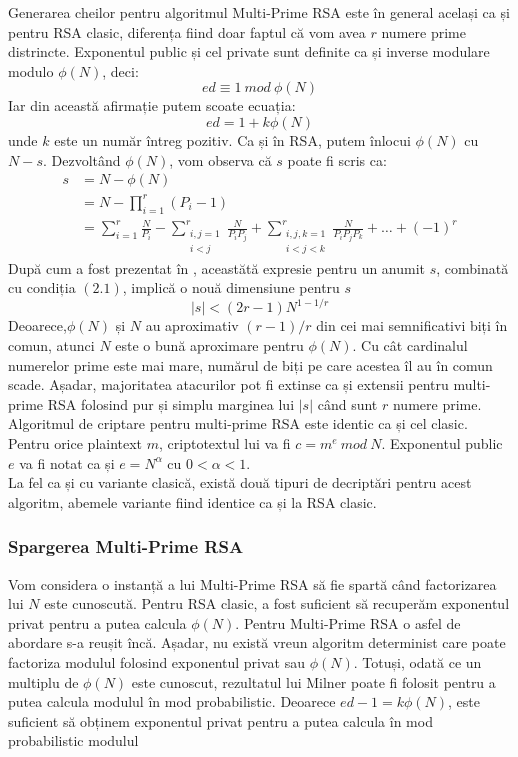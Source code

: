 \documentclass[12pt, oneside]{book}
\begin{document}
Generarea cheilor pentru algoritmul Multi-Prime RSA este în general același ca și pentru RSA clasic, diferența fiind doar faptul că vom avea $r$ numere prime distrincte. Exponentul public și cel private sunt definite ca și inverse modulare modulo $\phi(N)$, deci:
$$ ed \equiv 1 \ mod \ \phi(N)$$
Iar din această afirmație putem scoate ecuația:
$$ ed=1+k\phi(N)$$
unde $k$ este un număr întreg pozitiv. Ca și în RSA, putem înlocui $\phi(N)$ cu $N-s$. Dezvoltând $\phi(N)$, vom observa că $s$ poate fi scris ca:
\begin{align*}
s &= N - \phi(N) \\
&= N - \prod_{i=1}^{r} (P_i-1) \\
&= \sum_{i=1}^{r}\frac{N}{P_i} - \sum_{\substack{i,j=1 \\  i<j}}^{r} \frac{N}{P_iP_j} + \sum_{
\substack{i,j,k=1 \\ i<j<k}}^{r} \frac{N}{P_i P_j P_k} + \dots + (-1)^{r}
\end{align*}
După cum a fost prezentat în \cite{osutanoua}, aceastătă expresie pentru un anumit $s$, combinată cu condiția $(2.1)$, implică o nouă dimensiune pentru $s$
\begin{equation}
|s| < (2r-1)N^{1-1/r}
\end{equation}
Deoarece,$\phi(N)$ și $N$ au aproximativ $(r-1)/r$ din cei mai semnificativi biți în comun, atunci $N$ este o bună aproximare pentru $\phi(N)$. Cu cât cardinalul numerelor prime este mai mare, numărul de biți pe care acestea îl au în comun scade. Așadar, majoritatea atacurilor pot fi extinse ca și extensii pentru multi-prime RSA folosind pur și simplu marginea lui $|s|$ când sunt $r$ numere prime.\\
Algoritmul de criptare pentru multi-prime RSA este identic ca și cel clasic. Pentru orice plaintext $m$, criptotextul lui va fi $c = m^e \ mod \ N$. Exponentul public $e$ va fi notat ca și $e=N^{\alpha}$ cu $0<\alpha<1$.\\
La fel ca și cu variante clasică, există două tipuri de decriptări pentru acest algoritm, abemele variante fiind identice ca și la RSA clasic. 
\subsubsection{Spargerea Multi-Prime RSA}
Vom considera o instanță a lui Multi-Prime RSA să fie spartă când factorizarea lui $N$ este cunoscută. Pentru RSA clasic, a fost suficient să recuperăm exponentul privat pentru a putea calcula $\phi(N)$. Pentru Multi-Prime RSA o asfel de abordare s-a reușit încă. Așadar, nu există vreun algoritm determinist care poate factoriza modulul folosind exponentul privat sau $\phi(N)$. Totuși, odată ce un multiplu de $\phi(N)$ este cunoscut, rezultatul lui Milner \cite{Milner3} poate fi folosit pentru a putea calcula modulul în mod probabilistic. Deoarece $ed -1 = k\phi(N)$, este suficient să obținem exponentul privat pentru a putea calcula în mod probabilistic modulul
\end{document}
